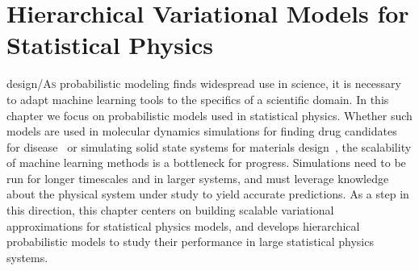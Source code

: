 \chapter{Hierarchical Variational Models for Statistical Physics}
\label{ch:hvm}
\lettrine[image=true,lines=3]{design/A}{s} probabilistic modeling finds widespread use in science, it is necessary to adapt machine learning tools to the specifics of a scientific domain. In this chapter we focus on probabilistic models used in statistical physics. Whether such models are used in molecular dynamics simulations for finding drug candidates for disease~\citep{shamay2018quantitative} or simulating solid state systems for materials design~\citep{schmidt2019recent}, the scalability of machine learning methods is a bottleneck for progress. Simulations need to be run for longer timescales and in larger systems, and must leverage knowledge about the physical system under study to yield accurate predictions. As a step in this direction, this chapter centers on building scalable variational approximations for statistical physics models, and develops hierarchical probabilistic models to study their performance in large statistical physics systems.